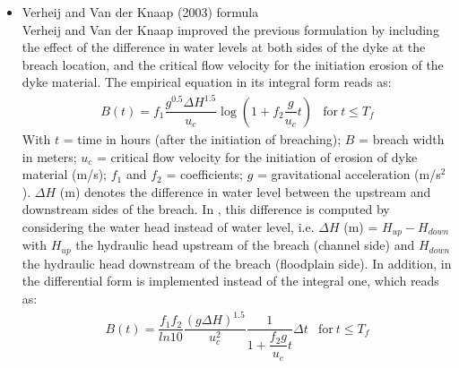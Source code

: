 \begin{itemize}
\item Verheij and Van der Knaap (2003) formula \\
Verheij and Van der Knaap \cite{Verheij2003} improved the previous formulation
by including the effect of the difference in water levels at both sides of the
dyke at the breach location, and the critical flow velocity for the initiation
erosion of the dyke material. The empirical equation in its integral form reads
as:
\begin{equation}
\label{eq:Verheij2003}
\begin{array}{lc}
B(t)=f_1\dfrac{g^{0.5}\Delta H^{1.5}}{u_c}\log\left(1+f_2\dfrac{g}{u_c}t\right) &
\text{for}~t\leq T_f
\end{array}
\end{equation}
With $t$ = time in hours (after the initiation of breaching); $B$ = breach width
in meters; $u_c$ = critical flow velocity for the initiation of erosion of dyke
material (m/s); $f_1$ and $f_2$ = coefficients; $g$ = gravitational acceleration
(m/s$^2$).
$\Delta H$ (m) denotes the difference in water level between the upstream and
downstream sides of the breach. In , this difference is computed by
considering the water head instead of water level, i.e. $\Delta H$ (m) =
$H_{up}-H_{down}$ with $H_{up}$ the hydraulic head upstream of the breach
(channel side) and $H_{down}$ the hydraulic head downstream of the breach
(floodplain side).
In addition, in  the differential form is implemented instead of the
integral one, which reads as:
\begin{equation}
\label{eq:Verheij2003:diff}
\begin{array}{lc}
B(t)=\dfrac{f_1 f_2}{ln 10}\dfrac{(g\Delta H)^{1.5}}{u_c^2}
\dfrac{1}{1+\dfrac{f_2g}{u_c}t}\Delta t & \text{for}~t\leq T_f
\end{array}
\end{equation}


\end{itemize}
